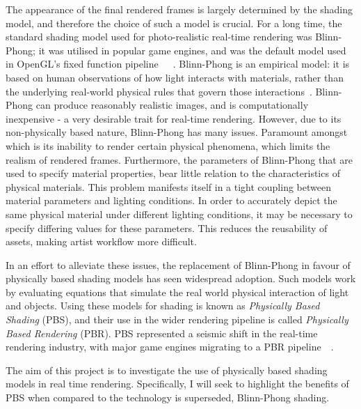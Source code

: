 The appearance of the final rendered frames is largely determined by the shading model, and therefore the choice of such a model is crucial. For a long time, the standard shading model used for photo-realistic real-time rendering was Blinn-Phong; it was utilised in popular game engines, and was the default model used in OpenGL's fixed function pipeline~\cite{UnityBlinnPhong}~\cite{UnrealBlinnPhong}~\cite{OpenGLBlinnPhongFixedFunction}. Blinn-Phong is an empirical model: it is based on human observations of how light interacts with materials, rather than the underlying real-world physical rules that govern those interactions~\cite{PhongShading}. Blinn-Phong can produce reasonably realistic images, and is computationally inexpensive - a very desirable trait for real-time rendering. However, due to its non-physically based nature, Blinn-Phong has many issues. Paramount amongst which is its inability to render certain physical phenomena, which limits the realism of rendered frames. Furthermore, the parameters of Blinn-Phong that are used to specify material properties, bear little relation to the characteristics of physical materials. This problem manifests itself in a tight coupling between material parameters and lighting conditions. In order to accurately depict the same physical material under different lighting conditions, it may be necessary to specify differing values for these parameters. This reduces the reusability of assets, making artist workflow more difficult.

In an effort to alleviate these issues, the replacement of Blinn-Phong in favour of physically based shading models has seen widespread adoption. Such models work by evaluating equations that simulate the real world physical interaction of light and objects. Using these models for shading is known as \textit{Physically Based Shading} (PBS), and their use in the wider rendering pipeline is called \textit{Physically Based Rendering} (PBR). PBS represented a seismic shift in the real-time rendering industry, with major game engines migrating to a PBR pipeline~\cite{RealShadingInUnreal}~\cite{MovingFrostbitetoPBR}.

The aim of this project is to investigate the use of physically based shading models in real time rendering. Specifically, I will seek to highlight the benefits of PBS when compared to the technology is superseded, Blinn-Phong shading.


